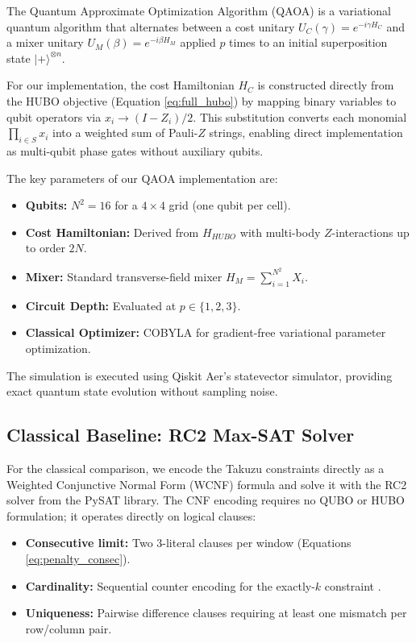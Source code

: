 \documentclass[eng]{ajceam-class}
\begin{document}
The Quantum Approximate Optimization Algorithm (QAOA) \cite{farhi2014qaoa} is a variational quantum algorithm that alternates between a cost unitary $U_C(\gamma) = e^{-i\gamma H_C}$ and a mixer unitary $U_M(\beta) = e^{-i\beta H_M}$ applied $p$ times to an initial superposition state $|+\rangle^{\otimes n}$.

For our implementation, the cost Hamiltonian $H_C$ is constructed directly from the HUBO objective (Equation \ref{eq:full_hubo}) by mapping binary variables to qubit operators via $x_i \rightarrow (I - Z_i)/2$. This substitution converts each monomial $\prod_{i \in S} x_i$ into a weighted sum of Pauli-$Z$ strings, enabling direct implementation as multi-qubit phase gates without auxiliary qubits.

The key parameters of our QAOA implementation are:

\begin{itemize}
 \item \textbf{Qubits:} $N^2 = 16$ for a $4 \times 4$ grid (one qubit per cell).
 \item \textbf{Cost Hamiltonian:} Derived from $H_{HUBO}$ with multi-body $Z$-interactions up to order $2N$.
 \item \textbf{Mixer:} Standard transverse-field mixer $H_M = \sum_{i=1}^{N^2} X_i$.
 \item \textbf{Circuit Depth:} Evaluated at $p \in \{1, 2, 3\}$.
 \item \textbf{Classical Optimizer:} COBYLA \cite{powell1994cobyla} for gradient-free variational parameter optimization.
\end{itemize}

The simulation is executed using Qiskit Aer's statevector simulator, providing exact quantum state evolution without sampling noise.

\subsection{Classical Baseline: RC2 Max-SAT Solver}

For the classical comparison, we encode the Takuzu constraints directly as a Weighted Conjunctive Normal Form (WCNF) formula and solve it with the RC2 solver \cite{ignatiev2019rc2} from the PySAT library. The CNF encoding requires no QUBO or HUBO formulation; it operates directly on logical clauses:

\begin{itemize}
 \item \textbf{Consecutive limit:} Two 3-literal clauses per window (Equations \ref{eq:penalty_consec}).
 \item \textbf{Cardinality:} Sequential counter encoding for the exactly-$k$ constraint \cite{sinz2005towards}.
 \item \textbf{Uniqueness:} Pairwise difference clauses requiring at least one mismatch per row/column pair.
\end{itemize}
\end{document}
